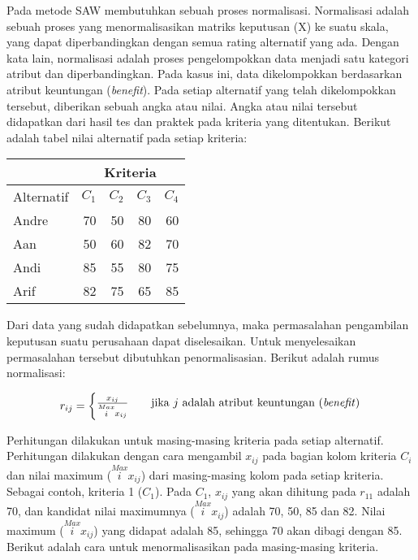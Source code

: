 \documentclass[a4paper,twoside]{article}
\begin{document}
\begin{enumerate}
Pada metode SAW membutuhkan sebuah proses normalisasi. Normalisasi adalah sebuah proses yang menormalisasikan matriks keputusan (X) ke suatu skala, yang dapat diperbandingkan dengan semua rating alternatif yang ada. Dengan kata lain, normalisasi adalah proses pengelompokkan data menjadi satu kategori atribut dan diperbandingkan. Pada kasus ini, data dikelompokkan berdasarkan atribut keuntungan (\textit{benefit}). Pada setiap alternatif yang telah dikelompokkan tersebut, diberikan sebuah angka atau nilai. Angka atau nilai tersebut didapatkan dari hasil tes dan praktek pada kriteria yang ditentukan. Berikut adalah tabel nilai alternatif pada setiap kriteria:
\begin{center}
  \begin{tabular}{|l|r|r|r|r|}  
    \hline
    &
    \multicolumn{4}{|c|}{Kriteria} \\
		\hline
    Alternatif    & $C_{1}$ & $C_{2}$ & $C_{3}$ & $C_{4}$ \\
    \hline
    Andre      & 70&50&80    & 60      \\
       Aan   &    50&60&82&70      \\
    Andi       & 85&55&80&75      \\
    Arif       & 82&75&65&85     \\
    \hline
  \end{tabular}
\end{center}	
Dari data yang sudah didapatkan sebelumnya, maka permasalahan pengambilan keputusan suatu perusahaan dapat diselesaikan. Untuk menyelesaikan permasalahan tersebut dibutuhkan penormalisasian. Berikut adalah rumus normalisasi:

	
	\[ r_{ij}  =
  \begin{cases}
    \frac{x_{ij}}{\stackrel{Max}{i} x_{ij}}      & \quad \text{jika } j \text{ adalah atribut keuntungan (\textit{benefit})}\\
	\end{cases}	  
\]


	Perhitungan dilakukan untuk masing-masing kriteria pada setiap alternatif. Perhitungan dilakukan dengan cara mengambil $x_{ij}$ pada bagian kolom kriteria $C_{i}$ dan nilai maximum (${\stackrel{Max}{i} x_{ij}}$) dari masing-masing kolom pada setiap kriteria. Sebagai contoh, kriteria 1 ($C_{1}$). Pada $C_{1}$, $x_{ij}$ yang akan dihitung pada $r_{11}$ adalah 70, dan kandidat nilai maximumnya (${\stackrel{Max}{i} x_{ij}}$) adalah 70, 50, 85 dan 82. Nilai maximum (${\stackrel{Max}{i} x_{ij}}$) yang didapat adalah 85, sehingga 70 akan dibagi dengan 85. Berikut adalah cara untuk menormalisasikan pada masing-masing kriteria.


\end{enumerate}
\end{document}
